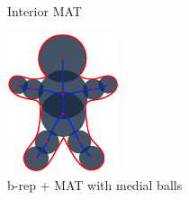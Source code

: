\begin{figure}
\begin{subfigure}[b]{0.25\linewidth}
		\caption{Interior MAT}
		\label{fig:gbm:maxis}
	\end{subfigure}
	
	\begin{subfigure}[b]{0.3\linewidth}
		\centering
		\includegraphics[width=\textwidth]{figs/gingerbreadman_mat.pdf}
		\caption{b-rep + MAT with medial balls}
		\label{fig:gbm:mballs}
	\end{subfigure}
	\qquad
	\begin{subfigure}[b]{0.3\linewidth}
		\centering

\end{subfigure}
\end{figure}
